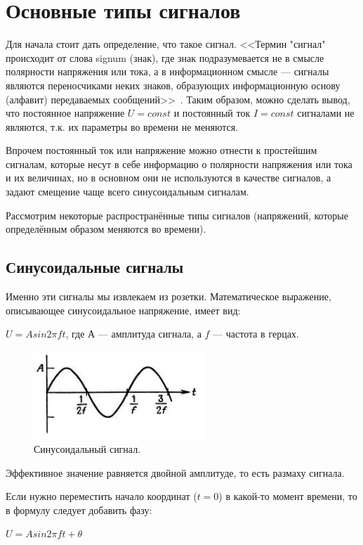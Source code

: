 \section{Основные типы сигналов}
Для начала стоит дать определение, что такое сигнал. <<Термин "сигнал" происходит от слова signum (знак), где знак подразумевается не в смысле полярности напряжения или тока, а в информационном смысле — сигналы являются переносчиками неких знаков, образующих информационную основу (алфавит) передаваемых сообщений>>~\cite{dgs}. Таким образом, можно сделать вывод, что постоянное напряжение $U=const$ и постоянный ток $I=const$ сигналами не являются, т.к. их параметры во времени не меняются.

Впрочем постоянный ток или напряжение можно отнести к простейшим сигналам, которые несут в себе информацию о полярности напряжения или тока и их величинах, но в основном они не используются в качестве сигналов, а задают смещение чаще всего синусоидальным сигналам.

Рассмотрим некоторые распространённые типы сигналов (напряжений, которые определённым образом меняются во времени).
\subsection{Синусоидальные сигналы}
Именно эти сигналы мы извлекаем из розетки. Математическое выражение, описывающее синусоидальное напряжение, имеет вид:

$U=A sin2 \pi ft$, где $А$ --- амплитуда сигнала, а $f$ --- частота в герцах.

	\begin{figure}[H]
    \centering
    \includegraphics[width=0.575\textwidth]{../image/s_sin.png}
    \caption{Синусоидальный сигнал.}
	\end{figure}
Эффективное значение равняется двойной амплитуде, то есть размаху сигнала. 

Если нужно переместить начало координат ($t=0$) в какой-то момент времени, то в формулу следует добавить фазу:

$U=A sin2 \pi ft + \theta$

